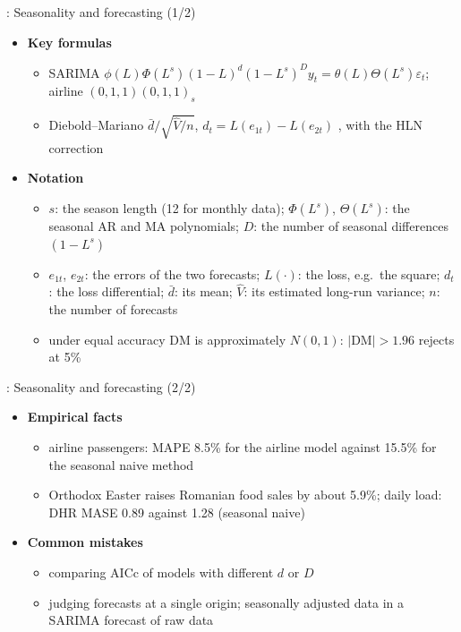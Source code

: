 \begin{frame}{: Seasonality and forecasting (1/2)}
\itemsize{\footnotesize}
\begin{itemize}
    \item \textbf{Key formulas}
    \begin{itemize}
        \item SARIMA $\phi(L)\Phi(L^s)(1 - L)^d(1 - L^s)^D y_t = \theta(L)\Theta(L^s)\varepsilon_t$; airline $(0,1,1)(0,1,1)_s$
        \item Diebold--Mariano $\bar d/\sqrt{\hat V/n}$, $d_t = L(e_{1t}) - L(e_{2t})$ , with the HLN correction 
    \end{itemize}
    \item \textbf{Notation}
    \begin{itemize}
        \item $s$: the season length (12 for monthly data); $\Phi(L^s)$, $\Theta(L^s)$: the seasonal AR and MA polynomials; $D$: the number of seasonal differences $(1 - L^s)$
        \item $e_{1t}$, $e_{2t}$: the errors of the two forecasts; $L(\cdot)$: the loss, e.g.\ the square; $d_t$: the loss differential; $\bar d$: its mean; $\hat V$: its estimated long-run variance; $n$: the number of forecasts
        \item under equal accuracy DM is approximately $N(0, 1)$: $|\mathrm{DM}| > 1.96$ rejects at 5\%
    \end{itemize}
\end{itemize}
\end{frame}

\begin{frame}{: Seasonality and forecasting (2/2)}
\itemsize{\footnotesize}
\begin{itemize}
    \item \textbf{Empirical facts}
    \begin{itemize}
        \item airline passengers: MAPE 8.5\% for the airline model against 15.5\% for the seasonal naive method
        \item Orthodox Easter raises Romanian food sales by about 5.9\%; daily load: DHR MASE 0.89 against 1.28 (seasonal naive)
    \end{itemize}
    \item \textbf{Common mistakes}
    \begin{itemize}
        \item comparing AICc of models with different $d$ or $D$
        \item judging forecasts at a single origin; seasonally adjusted data in a SARIMA forecast of raw data
    \end{itemize}
\end{itemize}
\end{frame}


